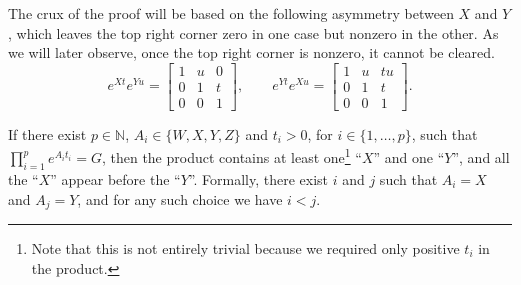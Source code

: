 \documentclass[format=acmsmall, review=false, screen=true]{acmart}
\newcommand{\Naturals}{\mathbb{N}}
\begin{document}
The crux of the proof will be based on the following asymmetry between $X$ and $Y$,
which leaves the top right corner zero in one case but nonzero in the other. As we will later
observe, once the top right corner is nonzero, it cannot be cleared.
\[
e^{Xt}e^{Yu}=\begin{bmatrix}1&u&0\\0&1&t\\0&0&1\end{bmatrix},\qquad
e^{Yt}e^{Xu}=\begin{bmatrix}1&u&tu\\0&1&t\\0&0&1\end{bmatrix}.
\]

\begin{proposition}\label{prop:eq_has_forced_order}
If there exist $p\in\Naturals$, $A_{i}\in\lbrace W,X,Y,Z\rbrace$ and $t_{i}>0$, for $i\in\lbrace 1,\ldots,p\rbrace$,
such that $\prod_{i=1}^{p} e^{A_{i}t_{i}}=G$, then the product contains at least one\footnote{Note
that this is not entirely trivial because we required only positive $t_{i}$ in the product.}
``$X$'' and one ``$Y$'', and all the ``$X$'' appear before the ``$Y$''.
Formally, there exist $i$ and $j$ such that $A_{i}=X$ and $A_{j}=Y$, and for
any such choice we have $i<j$.
\end{proposition}
\end{document}
